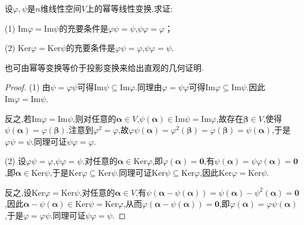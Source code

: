 \documentclass[../../main.tex]{subfiles}%
\begin{document}
\begin{proposition}\label{proposition:幂等变换值域与核空间相等的充要条件1}
设\(\varphi,\psi\)是\(n\)维线性空间\(V\)上的幂等线性变换,求证:

(1) \(\text{Im}\varphi=\text{Im}\psi\)的充要条件是\(\varphi\psi=\psi\),\(\psi\varphi=\varphi\)；

(2) \(\text{Ker}\varphi=\text{Ker}\psi\)的充要条件是\(\varphi\psi=\varphi\),\(\psi\varphi=\psi\).
\end{proposition}
\begin{note}
也可由幂等变换等价于投影变换来给出直观的几何证明.
\end{note}
\begin{proof}
(1) 由\(\psi=\varphi\psi\)可得\(\text{Im}\psi\subseteq\text{Im}\varphi\).同理由\(\varphi=\psi\varphi\)可得\(\text{Im}\varphi\subseteq\text{Im}\psi\).因此\(\text{Im}\varphi=\text{Im}\psi\).

反之,若\(\text{Im}\varphi=\text{Im}\psi\),则对任意的\(\boldsymbol{\alpha}\in V\),\(\psi(\boldsymbol{\alpha})\in\text{Im}\psi=\text{Im}\varphi\),故存在\(\boldsymbol{\beta}\in V\),使得\(\psi(\boldsymbol{\alpha})=\varphi(\boldsymbol{\beta})\).注意到\(\varphi^2=\varphi\),故\(\varphi\psi(\boldsymbol{\alpha})=\varphi^2(\boldsymbol{\beta})=\varphi(\boldsymbol{\beta})=\psi(\boldsymbol{\alpha})\),于是\(\varphi\psi=\psi\).同理可证\(\psi\varphi=\varphi\).

(2) 设\(\varphi\psi=\varphi\),\(\psi\varphi=\psi\).对任意的\(\boldsymbol{\alpha}\in\text{Ker}\varphi\),即\(\varphi(\boldsymbol{\alpha}) = \boldsymbol{0}\),有\(\psi(\boldsymbol{\alpha})=\psi\varphi(\boldsymbol{\alpha}) = \boldsymbol{0}\),即\(\boldsymbol{\alpha}\in\text{Ker}\psi\),于是\(\text{Ker}\varphi\subseteq\text{Ker}\psi\).同理可证\(\text{Ker}\psi\subseteq\text{Ker}\varphi\),因此\(\text{Ker}\varphi=\text{Ker}\psi\).

反之,设\(\text{Ker}\varphi=\text{Ker}\psi\).对任意的\(\boldsymbol{\alpha}\in V\),有\(\psi(\boldsymbol{\alpha}-\psi(\boldsymbol{\alpha}))=\psi(\boldsymbol{\alpha})-\psi^2(\boldsymbol{\alpha}) = \boldsymbol{0}\),因此\(\boldsymbol{\alpha}-\psi(\boldsymbol{\alpha})\in\text{Ker}\psi=\text{Ker}\varphi\),从而\(\varphi(\boldsymbol{\alpha}-\psi(\boldsymbol{\alpha})) = \boldsymbol{0}\),即\(\varphi(\boldsymbol{\alpha})=\varphi\psi(\boldsymbol{\alpha})\),于是\(\varphi=\varphi\psi\).同理可证\(\psi\varphi=\psi\).
\end{proof}
\end{document}
